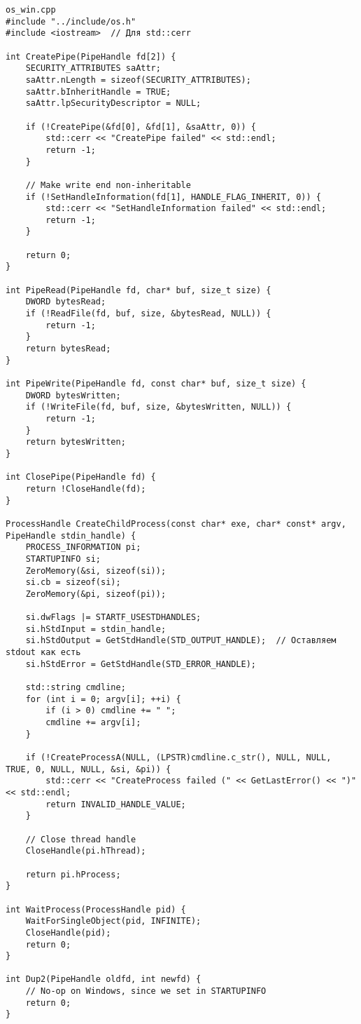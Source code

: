 \begin{verbatim}
os_win.cpp
#include "../include/os.h"
#include <iostream>  // Для std::cerr

int CreatePipe(PipeHandle fd[2]) {
    SECURITY_ATTRIBUTES saAttr;
    saAttr.nLength = sizeof(SECURITY_ATTRIBUTES);
    saAttr.bInheritHandle = TRUE;
    saAttr.lpSecurityDescriptor = NULL;

    if (!CreatePipe(&fd[0], &fd[1], &saAttr, 0)) {
        std::cerr << "CreatePipe failed" << std::endl;
        return -1;
    }

    // Make write end non-inheritable
    if (!SetHandleInformation(fd[1], HANDLE_FLAG_INHERIT, 0)) {
        std::cerr << "SetHandleInformation failed" << std::endl;
        return -1;
    }

    return 0;
}

int PipeRead(PipeHandle fd, char* buf, size_t size) {
    DWORD bytesRead;
    if (!ReadFile(fd, buf, size, &bytesRead, NULL)) {
        return -1;
    }
    return bytesRead;
}

int PipeWrite(PipeHandle fd, const char* buf, size_t size) {
    DWORD bytesWritten;
    if (!WriteFile(fd, buf, size, &bytesWritten, NULL)) {
        return -1;
    }
    return bytesWritten;
}

int ClosePipe(PipeHandle fd) {
    return !CloseHandle(fd);
}

ProcessHandle CreateChildProcess(const char* exe, char* const* argv, PipeHandle stdin_handle) {
    PROCESS_INFORMATION pi;
    STARTUPINFO si;
    ZeroMemory(&si, sizeof(si));
    si.cb = sizeof(si);
    ZeroMemory(&pi, sizeof(pi));

    si.dwFlags |= STARTF_USESTDHANDLES;
    si.hStdInput = stdin_handle;
    si.hStdOutput = GetStdHandle(STD_OUTPUT_HANDLE);  // Оставляем stdout как есть
    si.hStdError = GetStdHandle(STD_ERROR_HANDLE);

    std::string cmdline;
    for (int i = 0; argv[i]; ++i) {
        if (i > 0) cmdline += " ";
        cmdline += argv[i];
    }

    if (!CreateProcessA(NULL, (LPSTR)cmdline.c_str(), NULL, NULL, TRUE, 0, NULL, NULL, &si, &pi)) {
        std::cerr << "CreateProcess failed (" << GetLastError() << ")" << std::endl;
        return INVALID_HANDLE_VALUE;
    }

    // Close thread handle
    CloseHandle(pi.hThread);

    return pi.hProcess;
}

int WaitProcess(ProcessHandle pid) {
    WaitForSingleObject(pid, INFINITE);
    CloseHandle(pid);
    return 0;
}

int Dup2(PipeHandle oldfd, int newfd) {
    // No-op on Windows, since we set in STARTUPINFO
    return 0;
}
\end{verbatim}

